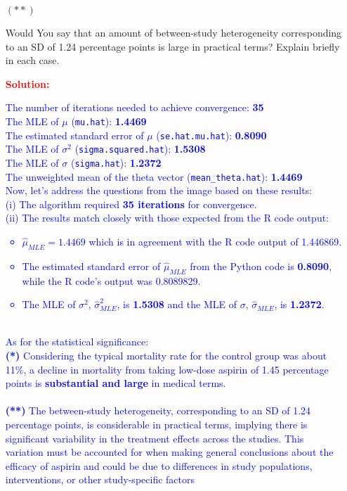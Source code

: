 \documentclass[12pt]{article}
\begin{document}
\begin{itemize}
\begin{itemize}
\begin{itemize}
\item[$( ** )$]

Would You say that an amount of between-study heterogeneity corresponding to an SD of 1.24 percentage points is large in practical terms? Explain briefly in each case. \textit{\fbox{\textbf{[10 points]}}}


\textcolor{red}{\textbf{Solution:}} \\
\textcolor{blue}{
The number of iterations needed to achieve convergence: \textbf{35}
\\
The MLE of \( \mu \) (\texttt{mu.hat}): \textbf{1.4469}
\\
The estimated standard error of \( \mu \) (\texttt{se.hat.mu.hat}): \textbf{0.8090}
\\
The MLE of \( \sigma^2 \) (\texttt{sigma.squared.hat}): \textbf{1.5308}
\\
The MLE of \( \sigma \) (\texttt{sigma.hat}): \textbf{1.2372}
\\
The unweighted mean of the theta vector (\texttt{mean\_theta.hat}): \textbf{1.4469}
\\
Now, let's address the questions from the image based on these results:
\\
(i) The algorithm required \textbf{35 iterations} for convergence.
\\
(ii) The results match closely with those expected from the R code output:
\begin{itemize}
  \item \( \hat{\mu}_{MLE} = 1.4469 \) which is in agreement with the R code output of 1.446869.
  \item The estimated standard error of \( \hat{\mu}_{MLE} \) from the Python code is \textbf{0.8090}, while the R code's output was 0.8089829.
  \item The MLE of \( \sigma^2 \), \( \hat{\sigma}^2_{MLE} \), is \textbf{1.5308} and the MLE of \( \sigma \), \( \hat{\sigma}_{MLE} \), is \textbf{1.2372}.
\end{itemize}
\\
As for the statistical significance: \\
  \textbf{(*)} Considering the typical mortality rate for the control group was about 11\%, a decline in mortality from taking low-dose aspirin of 1.45 percentage points is \textbf{substantial and large} in medical terms.
  \\ \\
  \textbf{(**)} The between-study heterogeneity, corresponding to an SD of 1.24 percentage points, is considerable in practical terms, implying there is significant variability in the treatment effects across the studies. This variation must be accounted for when making general conclusions about the efficacy of aspirin and could be due to differences in study populations, interventions, or other study-specific factors
}
\end{itemize}
\end{itemize}
\end{itemize}
\end{document}
